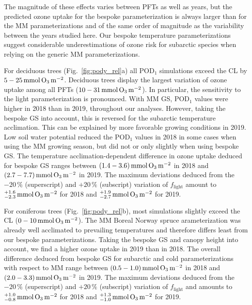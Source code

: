 \documentclass[bg, manuscript]{copernicus}
\begin{document}
The magnitude of these effects varies between PFTs as well as years, but the predicted ozone uptake for the bespoke parameterization is always larger than for the MM parameterizations and of the same order of magnitude as the variability between the years studied here. Our bespoke temperature parameterizations suggest considerable underestimations of ozone risk for subarctic species when relying on the generic MM parameterizations.

For deciduous trees (Fig.~\ref{fig:pody_rel}a) all $\mathrm{POD_1}$ simulations exceed the CL by $5-25\,\unit{mmol\,\chem{O_3}\,m^{-2}}$. Deciduous trees display the largest variation of ozone uptake among all PFTs ($10-31\,\unit{mmol\,\chem{O_3}\,m^{-2}}$). In particular, the sensitivity to the light parameterization is pronounced. With MM GS, $\mathrm{POD_1}$ values were higher in 2018 than in 2019, throughout our analyses. However, taking the bespoke GS into account, this is reversed for the subarctic temperature acclimation. This can be explained by more favorable growing conditions in 2019. Low soil water potential reduced the $\mathrm{POD_1}$ values in 2018 in some cases when using the MM growing season, but did not or only slightly when using bespoke GS. The temperature acclimation-dependent difference in ozone uptake deduced for bespoke GS ranges between $(1.4-3.6)\,\unit{mmol\,\chem{O_3}\,m^{-2}}$ in 2018 and $(2.7-7.7)\,\unit{mmol\,\chem{O_3}\,m^{-2}}$ in 2019. The maximum deviations deduced from the $-20\,\unit{\%}$ (superscript) and $+20\,\unit{\%}$ (subscript) variation of $f_\mathrm{light}$ amount to $^{+1.6}_{-2.3}\,\unit{mmol\,\chem{O_3}\,m^{-2}}$ for 2018 and $^{+1.9}_{-2.7}\,\unit{mmol\,\chem{O_3}\,m^{-2}}$ for 2019. 

For coniferous trees (Fig.~\ref{fig:pody_rel}b), most simulations slightly exceed the CL ($0-10\,\unit{mmol\,\chem{O_3}\,m^{-2}}$). The MM Boreal Norway spruce arameterization was already well acclimated to prevailing temperatures and therefore differs least from our bespoke parameterizations. Taking the bespoke GS and canopy height into account, we find a higher ozone uptake in 2019 than in 2018. The overall difference deduced from bespoke GS for subarctic and cold parameterizations with respect to MM range between $(0.5-1.0)\,\unit{mmol\,\chem{O_3}\,m^{-2}}$ in 2018 and $(2.0-3.3)\,\unit{mmol\,\chem{O_3}\,m^{-2}}$ in 2019. The maximum deviations deduced from the $-20\,\unit{\%}$ (superscript) and $+20\,\unit{\%}$ (subscript) variation of $f_\mathrm{light}$ and amounts to $^{+1.0}_{-0.8}\,\unit{mmol\,\chem{O_3}\,m^{-2}}$ for 2018 and $^{+1.3}_{-1.0}\,\unit{mmol\,\chem{O_3}\,m^{-2}}$ for 2019.
\end{document}
